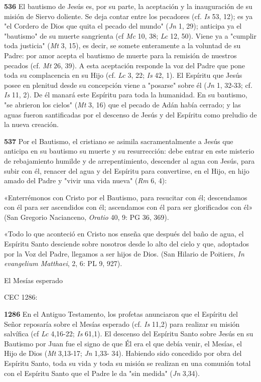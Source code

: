 \documentclass[]{article}
\begin{document}
\textbf{536} El bautismo de Jesús es, por su parte, la aceptación y la
inauguración de su misión de Siervo doliente. Se deja contar entre los
pecadores (cf. \emph{Is} 53, 12); es ya "el Cordero de Dios que quita el
pecado del mundo" (\emph{Jn} 1, 29); anticipa ya el "bautismo" de su
muerte sangrienta (cf \emph{Mc} 10, 38; \emph{Lc} 12, 50). Viene ya a
"cumplir toda justicia" (\emph{Mt} 3, 15), es decir, se somete
enteramente a la voluntad de su Padre: por amor acepta el bautismo de
muerte para la remisión de nuestros pecados (cf. \emph{Mt} 26, 39). A
esta aceptación responde la voz del Padre que pone toda su complacencia
en su Hijo (cf. \emph{Lc} 3, 22; \emph{Is} 42, 1). El Espíritu que Jesús
posee en plenitud desde su concepción viene a "posarse" sobre él
(\emph{Jn} 1, 32-33; cf. \emph{Is} 11, 2). De él manará este Espíritu
para toda la humanidad. En su bautismo, "se abrieron los cielos"
(\emph{Mt} 3, 16) que el pecado de Adán había cerrado; y las aguas
fueron santificadas por el descenso de Jesús y del Espíritu como
preludio de la nueva creación.

\textbf{537} Por el Bautismo, el cristiano se asimila sacramentalmente a
Jesús que anticipa en su bautismo su muerte y su resurrección: debe
entrar en este misterio de rebajamiento humilde y de arrepentimiento,
descender al agua con Jesús, para subir con él, renacer del agua y del
Espíritu para convertirse, en el Hijo, en hijo amado del Padre y "vivir
una vida nueva" (\emph{Rm} 6, 4):

«Enterrémonos con Cristo por el Bautismo, para resucitar con él;
descendamos con él para ser ascendidos con él; ascendamos con él para
ser glorificados con él» (San Gregorio Nacianceno, \emph{Oratio} 40, 9:
PG 36, 369).

«Todo lo que aconteció en Cristo nos enseña que después del baño de
agua, el Espíritu Santo desciende sobre nosotros desde lo alto del cielo
y que, adoptados por la Voz del Padre, llegamos a ser hijos de Dios.
(San Hilario de Poitiers, \emph{In evangelium Matthaei}, 2, 6: PL 9,
927).

El Mesías esperado

CEC 1286:

\textbf{1286} En el Antiguo Testamento, los profetas anunciaron que el
Espíritu del Señor reposaría sobre el Mesías esperado (cf. \emph{Is}
11,2) para realizar su misión salvífica (cf \emph{Lc} 4,16-22; \emph{Is}
61,1). El descenso del Espíritu Santo sobre Jesús en su Bautismo por
Juan fue el signo de que Él era el que debía venir, el Mesías, el Hijo
de Dios (\emph{Mt} 3,13-17; \emph{Jn} 1,33- 34). Habiendo sido concedido
por obra del Espíritu Santo, toda su vida y toda su misión se realizan
en una comunión total con el Espíritu Santo que el Padre le da "sin
medida" (\emph{Jn} 3,34).
\end{document}
